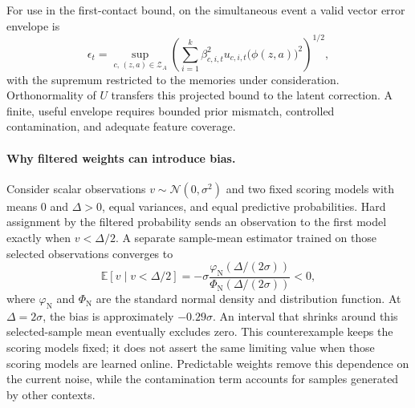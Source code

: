 For use in the first-contact bound, on the simultaneous event a valid vector error envelope is
\[
\epsilon_t=\sup_{c,\,(z,a)\in\mathcal Z_A}
\left(\sum_{i=1}^k\beta_{c,i,t}^2
u_{c,i,t}\bigl(\phi(z,a)\bigr)^2\right)^{1/2},
\]
with the supremum restricted to the memories under consideration. Orthonormality of $U$ transfers this projected bound to the latent correction. A finite, useful envelope requires bounded prior mismatch, controlled contamination, and adequate feature coverage.

\paragraph{Why filtered weights can introduce bias.}
Consider scalar observations $v\sim\mathcal N(0,\sigma^2)$ and two fixed scoring models with means $0$ and $\Delta>0$, equal variances, and equal predictive probabilities. Hard assignment by the filtered probability sends an observation to the first model exactly when $v<\Delta/2$. A separate sample-mean estimator trained on those selected observations converges to
\[
\mathbb E[v\mid v<\Delta/2]
=-\sigma\frac{\varphi_{\mathrm N}(\Delta/(2\sigma))}
{\Phi_{\mathrm N}(\Delta/(2\sigma))}<0,
\]
where $\varphi_{\mathrm N}$ and $\Phi_{\mathrm N}$ are the standard normal density and distribution function. At $\Delta=2\sigma$, the bias is approximately $-0.29\sigma$. An interval that shrinks around this selected-sample mean eventually excludes zero. This counterexample keeps the scoring models fixed; it does not assert the same limiting value when those scoring models are learned online. Predictable weights remove this dependence on the current noise, while the contamination term accounts for samples generated by other contexts.
